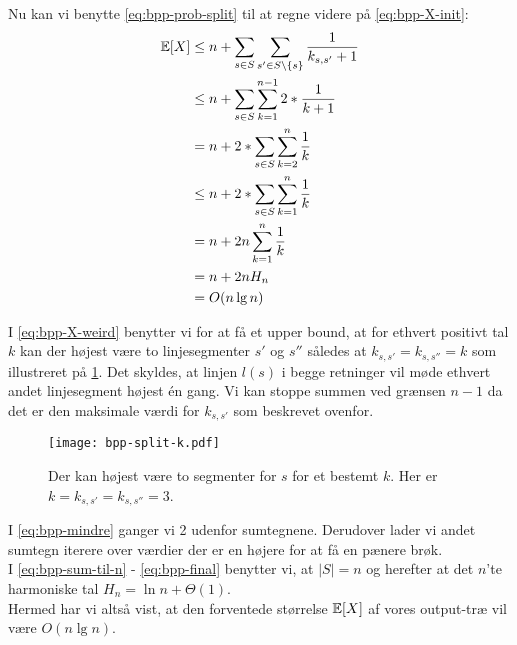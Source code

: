 Nu kan vi benytte \cref{eq:bpp-prob-split} til at regne videre på \cref{eq:bpp-X-init}:
\begin{align}
{\mathbb E}[X] &\leq n + \sum_{s \in S} \sum_{s' \in S \backslash \{ s\}} \frac{1}{k_{s, s'}+1} \nonumber \\
      &\leq n + \sum_{s \in S} \sum_{k=1}^{n-1} 2 * \frac{1}{k+1} \label{eq:bpp-X-weird} \\
      &= n + 2 * \sum_{s \in S} \sum_{k=2}^{n} \frac{1}{k} \label{eq:bpp-mindre} \\
      &\leq n + 2 * \sum_{s \in S} \sum_{k=1}^{n} \frac{1}{k} \nonumber \\
      &= n + 2n \sum_{k=1}^{n} \frac{1}{k} \label{eq:bpp-sum-til-n} \\
      &= n + 2n H_n \label{eq:bpp-harmonic} \\
      &= O(n \lg n) \label{eq:bpp-final}
\end{align}


I \cref{eq:bpp-X-weird} benytter vi for at få et upper bound, at for ethvert positivt tal $k$ kan der højest være to linjesegmenter $s'$ og $s''$ således at $k_{s, s'} = k_{s, s''} = k$ som illustreret på \ref{fig:bpp-split-k}. Det skyldes, at linjen $l(s)$ i begge retninger vil møde ethvert andet linjesegment højest én gang. Vi kan stoppe summen ved grænsen $n-1$ da det er den maksimale værdi for $k_{s, s'}$ som beskrevet ovenfor.

\begin{figure}[H]
    \begin{center}
    \texttt{[image: bpp-split-k.pdf]}
    \end{center}
    \caption{Der kan højest være to segmenter for $s$ for et bestemt $k$. Her er $k = k_{s, s'} = k_{s, s''} = 3$.}
    \label{fig:bpp-split-k}
\end{figure}

I \cref{eq:bpp-mindre} ganger vi 2 udenfor sumtegnene. Derudover lader vi andet sumtegn iterere over værdier der er en højere for at få en pænere brøk.\\
I \cref{eq:bpp-sum-til-n} - \cref{eq:bpp-final} benytter vi, at $|S| = n$ og herefter at det $n$'te harmoniske tal $H_n = \ln n + \Theta(1)$.\\

Hermed har vi altså vist, at den forventede størrelse ${\mathbb E}[X]$ af vores output-træ vil være $O(n \lg n)$.
